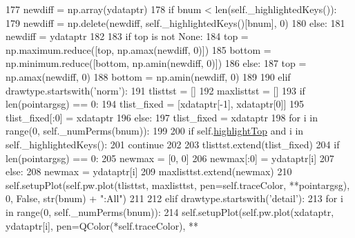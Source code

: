 \begin{DoxyCode}
177                     newdiff = np.array(ydataptr)
178                     \textcolor{keywordflow}{if} bnum < len(self.\_highlightedKeys()):
179                         newdiff = np.delete(newdiff, self.\_highlightedKeys()[bnum], 0)
180                 \textcolor{keywordflow}{else}:
181                     newdiff = ydataptr
182 
183                 \textcolor{keywordflow}{if} top \textcolor{keywordflow}{is} \textcolor{keywordflow}{not} \textcolor{keywordtype}{None}:
184                     top = np.maximum.reduce([top, np.amax(newdiff, 0)])
185                     bottom = np.minimum.reduce([bottom, np.amin(newdiff, 0)])
186                 \textcolor{keywordflow}{else}:
187                     top = np.amax(newdiff, 0)
188                     bottom = np.amin(newdiff, 0)
189 
190             \textcolor{keywordflow}{elif} drawtype.startswith(\textcolor{stringliteral}{'norm'}):
191                 tlisttst = []
192                 maxlisttst = []
193                 \textcolor{keywordflow}{if} len(pointargsg) == 0:
194                     tlist\_fixed = [xdataptr[-1], xdataptr[0]]
195                     tlist\_fixed[:0] = xdataptr
196                 \textcolor{keywordflow}{else}:
197                     tlist\_fixed = xdataptr
198                 \textcolor{keywordflow}{for} i \textcolor{keywordflow}{in} range(0, self.\_numPerms(bnum)):
199 
200                     \textcolor{keywordflow}{if} self.\hyperlink{classsoftware_1_1chipwhisperer_1_1common_1_1results_1_1__plotdata_1_1AttackResultPlot_af92b8a374c600cd3e8c5cf55118dccff}{highlightTop} \textcolor{keywordflow}{and} i \textcolor{keywordflow}{in} self.\_highlightedKeys():
201                         \textcolor{keywordflow}{continue}
202 
203                     tlisttst.extend(tlist\_fixed)
204                     \textcolor{keywordflow}{if} len(pointargsg) == 0:
205                         newmax = [0, 0]
206                         newmax[:0] = ydataptr[i]
207                     \textcolor{keywordflow}{else}:
208                         newmax = ydataptr[i]
209                     maxlisttst.extend(newmax)
210                 self.setupPlot(self.pw.plot(tlisttst, maxlisttst, pen=self.traceColor, **pointargsg), 0, \textcolor{keyword}{
      False}, str(bnum) + \textcolor{stringliteral}{":All"})
211 
212             \textcolor{keywordflow}{elif} drawtype.startswith(\textcolor{stringliteral}{'detail'}):
213                 \textcolor{keywordflow}{for} i \textcolor{keywordflow}{in} range(0, self.\_numPerms(bnum)):
214                     self.setupPlot(self.pw.plot(xdataptr, ydataptr[i], pen=QColor(*self.traceColor), **

\end{DoxyCode}
